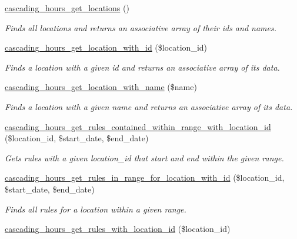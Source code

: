 \begin{DoxyCompactItemize}
\hyperlink{cascading__hours_8module_a50819a84eb261e9780e89503b50e7989_a50819a84eb261e9780e89503b50e7989}{cascading\+\_\+hours\+\_\+get\+\_\+locations} ()
\begin{DoxyCompactList}\small\item\em Finds all locations and returns an associative array of their ids and names. \end{DoxyCompactList}\item 
\hyperlink{cascading__hours_8module_a834c91bd35fd40c8837af7358e446667_a834c91bd35fd40c8837af7358e446667}{cascading\+\_\+hours\+\_\+get\+\_\+location\+\_\+with\+\_\+id} (\$location\+\_\+id)
\begin{DoxyCompactList}\small\item\em Finds a location with a given id and returns an associative array of its data. \end{DoxyCompactList}\item 
\hyperlink{cascading__hours_8module_ac7803537daed138b22c6159250ee0488_ac7803537daed138b22c6159250ee0488}{cascading\+\_\+hours\+\_\+get\+\_\+location\+\_\+with\+\_\+name} (\$name)
\begin{DoxyCompactList}\small\item\em Finds a location with a given name and returns an associative array of its data. \end{DoxyCompactList}\item 
\hyperlink{cascading__hours_8module_a2ea22f68fee5dbe9a46d85414b8e967a_a2ea22f68fee5dbe9a46d85414b8e967a}{cascading\+\_\+hours\+\_\+get\+\_\+rules\+\_\+contained\+\_\+within\+\_\+range\+\_\+with\+\_\+location\+\_\+id} (\$location\+\_\+id, \$start\+\_\+date, \$end\+\_\+date)
\begin{DoxyCompactList}\small\item\em Gets rules with a given location\+\_\+id that start and end within the given range. \end{DoxyCompactList}\item 
\hyperlink{cascading__hours_8module_a49f6056c85219023c24105193ee6a5e9_a49f6056c85219023c24105193ee6a5e9}{cascading\+\_\+hours\+\_\+get\+\_\+rules\+\_\+in\+\_\+range\+\_\+for\+\_\+location\+\_\+with\+\_\+id} (\$location\+\_\+id, \$start\+\_\+date, \$end\+\_\+date)
\begin{DoxyCompactList}\small\item\em Finds all rules for a location within a given range. \end{DoxyCompactList}\item 
\hyperlink{cascading__hours_8module_a75d8b74664ee20418d424394a6213de4_a75d8b74664ee20418d424394a6213de4}{cascading\+\_\+hours\+\_\+get\+\_\+rules\+\_\+with\+\_\+location\+\_\+id} (\$location\+\_\+id)

\end{DoxyCompactItemize}
